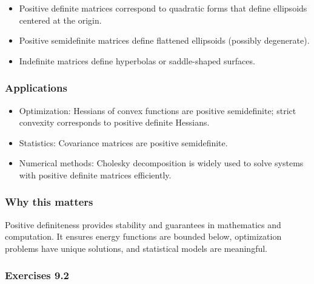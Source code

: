 \documentclass[
  12pt,
  a4paper,
]{article}
\begin{document}
\begin{itemize}
\item
  Positive definite matrices correspond to quadratic forms that define
  ellipsoids centered at the origin.
\item
  Positive semidefinite matrices define flattened ellipsoids (possibly
  degenerate).
\item
  Indefinite matrices define hyperbolas or saddle-shaped surfaces.
\end{itemize}

\subsubsection{Applications}\label{applications}

\begin{itemize}
\item
  Optimization: Hessians of convex functions are positive semidefinite;
  strict convexity corresponds to positive definite Hessians.
\item
  Statistics: Covariance matrices are positive semidefinite.
\item
  Numerical methods: Cholesky decomposition is widely used to solve
  systems with positive definite matrices efficiently.
\end{itemize}

\subsubsection{Why this matters}\label{why-this-matters-33}

Positive definiteness provides stability and guarantees in mathematics
and computation. It ensures energy functions are bounded below,
optimization problems have unique solutions, and statistical models are
meaningful.

\subsubsection{Exercises 9.2}\label{exercises-92}
\end{document}
